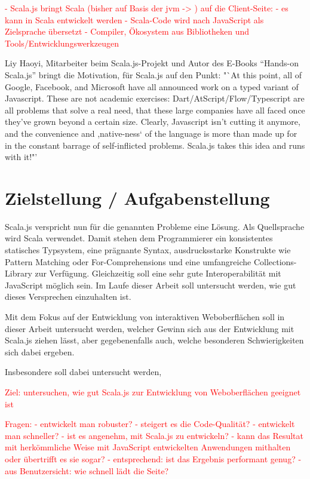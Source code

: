 \documentclass[a4paper, 12pt, hidelinks, listof=totoc, listoftables=totoc, bibliography=totoc]{scrreprt}
\newcommand{\TODO}[1]{\textcolor{red}{#1}\newline}
\begin{document}
\TODO{- Scala.js bringt Scala (bisher auf Basis der jvm -> %
) auf die Client-Seite:}
\TODO{  - es kann in Scala entwickelt werden}
\TODO{  - Scala-Code wird nach JavaScript als Zielsprache übersetzt}
\TODO{  - Compiler, Ökosystem aus Bibliotheken und Tools/Entwicklungswerkzeugen}




Liy Haoyi, Mitarbeiter beim Scala.js-Projekt und Autor des E-Books "`Hands-on Scala.js"' bringt die Motivation, für Scala.js auf den Punkt: "`At this point, all of Google, Facebook, and Microsoft have all announced work on a typed variant of Javascript. These are not academic exercises: Dart/AtScript/Flow/Typescript are all problems that solve a real need, that these large companies have all faced once they've grown beyond a certain size. Clearly, Javascript isn't cutting it anymore, and the convenience and ,native-ness` of the language is more than made up for in the constant barrage of self-inflicted problems. Scala.js takes this idea and runs with it!"'\cite[\#TheLanguage]{haoyi.HOS}




\section{Zielstellung / Aufgabenstellung}

Scala.js verspricht nun für die genannten Probleme eine Lösung. Als Quellsprache wird Scala verwendet. Damit stehen dem Programmierer ein konsistentes statisches Typsystem, eine prägnante Syntax, ausdrucksstarke Konstrukte wie Pattern Matching oder For-Comprehensions und eine umfangreiche Collections-Library zur Verfügung. Gleichzeitig soll eine sehr gute Interoperabilität mit JavaScript möglich sein. Im Laufe dieser Arbeit soll untersucht werden, wie gut dieses Versprechen einzuhalten ist.

Mit dem Fokus auf der Entwicklung von interaktiven Weboberflächen soll in dieser Arbeit untersucht werden, welcher Gewinn sich aus der Entwicklung mit Scala.js ziehen lässt, aber gegebenenfalls auch, welche besonderen Schwierigkeiten sich dabei ergeben.  



Insbesondere soll dabei untersucht werden, 




\TODO{Ziel: untersuchen, wie gut Scala.js zur Entwicklung von Weboberflächen geeignet ist}

\TODO{Fragen:}
\TODO{  - entwickelt man robuster?}
\TODO{  - steigert es die Code-Qualität?}
\TODO{  - entwickelt man schneller?}
\TODO{  - ist es angenehm, mit Scala.js zu entwickeln?}
\TODO{  - kann das Resultat mit herkömmliche Weise mit JavaScript entwickelten Anwendungen mithalten oder übertrifft es sie sogar?}
\TODO{  - entsprechend: ist das Ergebnis performant genug?}
\TODO{  - aus Benutzersicht: wie schnell lädt die Seite?}
\end{document}
